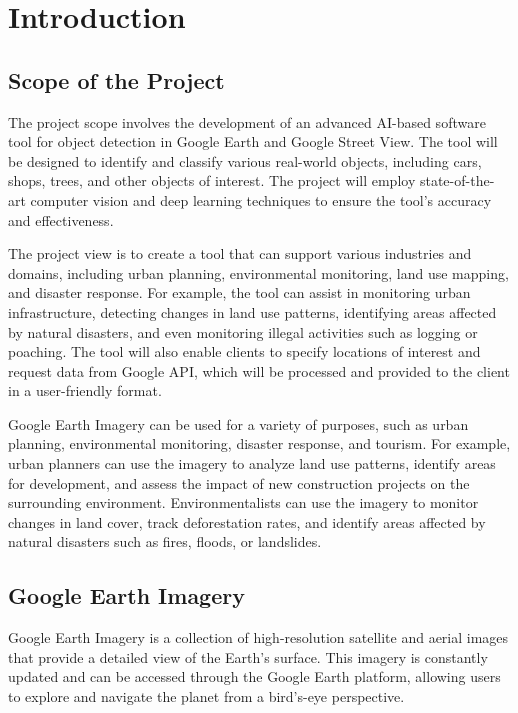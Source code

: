 \chapter{Introduction}





\section{Scope of the Project}
The project scope involves the development of an advanced AI-based software tool for object detection in Google Earth and Google Street View. The tool will be designed to identify and classify various real-world objects, including cars, shops, trees, and other objects of interest. The project will employ state-of-the-art computer vision and deep learning techniques to ensure the tool's accuracy and effectiveness.

The project view is to create a tool that can support various industries and domains, including urban planning, environmental monitoring, land use mapping, and disaster response. For example, the tool can assist in monitoring urban infrastructure, detecting changes in land use patterns, identifying areas affected by natural disasters, and even monitoring illegal activities such as logging or poaching. The tool will also enable clients to specify locations of interest and request data from Google API, which will be processed and provided to the client in a user-friendly format.

Google Earth Imagery can be used for a variety of purposes, such as urban planning, environmental monitoring, disaster response, and tourism. For example, urban planners can use the imagery to analyze land use patterns, identify areas for development, and assess the impact of new construction projects on the surrounding environment. Environmentalists can use the imagery to monitor changes in land cover, track deforestation rates, and identify areas affected by natural disasters such as fires, floods, or landslides.


\section{Google Earth Imagery}
Google Earth Imagery is a collection of high-resolution satellite and aerial images that provide a detailed view of the Earth's surface. This imagery is constantly updated and can be accessed through the Google Earth platform, allowing users to explore and navigate the planet from a bird's-eye perspective.

